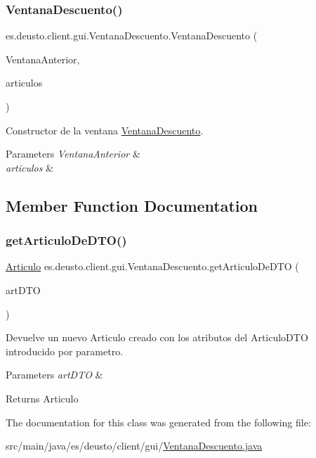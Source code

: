\subsubsection{\texorpdfstring{VentanaDescuento()}{VentanaDescuento()}}
{\footnotesize\ttfamily es.\+deusto.\+client.\+gui.\+Ventana\+Descuento.\+Ventana\+Descuento (\begin{DoxyParamCaption}\item[{final J\+Frame}]{Ventana\+Anterior,  }\item[{List$<$ \mbox{\hyperlink{classes_1_1deusto_1_1server_1_1dto_1_1_articulo_d_t_o}{Articulo\+D\+TO}} $>$}]{articulos }\end{DoxyParamCaption})}

Constructor de la ventana \mbox{\hyperlink{classes_1_1deusto_1_1client_1_1gui_1_1_ventana_descuento}{Ventana\+Descuento}}. 
\begin{DoxyParams}{Parameters}
{\em Ventana\+Anterior} & \\
\hline
{\em articulos} & \\
\hline
\end{DoxyParams}


\subsection{Member Function Documentation}
\mbox{\label{classes_1_1deusto_1_1client_1_1gui_1_1_ventana_descuento_a9c176013a8dcfac308ca22d37aafe4d2}} 
\subsubsection{\texorpdfstring{getArticuloDeDTO()}{getArticuloDeDTO()}}
{\footnotesize\ttfamily \mbox{\hyperlink{classes_1_1deusto_1_1client_1_1data_1_1_articulo}{Articulo}} es.\+deusto.\+client.\+gui.\+Ventana\+Descuento.\+get\+Articulo\+De\+D\+TO (\begin{DoxyParamCaption}\item[{\mbox{\hyperlink{classes_1_1deusto_1_1server_1_1dto_1_1_articulo_d_t_o}{Articulo\+D\+TO}}}]{art\+D\+TO }\end{DoxyParamCaption})}

Devuelve un nuevo Articulo creado con los atributos del Articulo\+D\+TO introducido por parametro. 
\begin{DoxyParams}{Parameters}
{\em art\+D\+TO} & \\
\hline
\end{DoxyParams}
\begin{DoxyReturn}{Returns}
Articulo 
\end{DoxyReturn}


The documentation for this class was generated from the following file\+:\begin{DoxyCompactItemize}
\item 
src/main/java/es/deusto/client/gui/\mbox{\hyperlink{_ventana_descuento_8java}{Ventana\+Descuento.\+java}}\end{DoxyCompactItemize}
